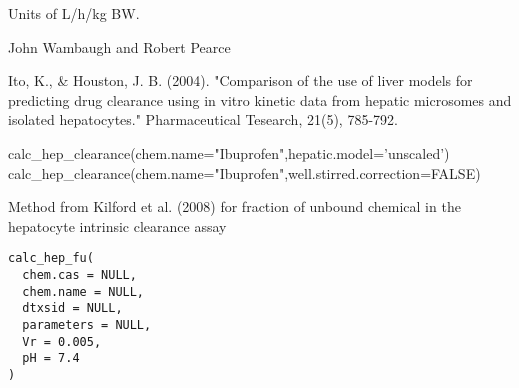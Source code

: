 \documentclass[a4paper]{book}
\begin{document}
%
\begin{Value}
\begin{ldescription}
\item[\code{Hepatic Clearance}] Units of L/h/kg BW.
\end{ldescription}
\end{Value}
%
\begin{Author}\relax
John Wambaugh and Robert Pearce
\end{Author}
%
\begin{References}\relax
Ito, K., \& Houston, J. B. (2004). "Comparison of the use of liver models for 
predicting drug clearance using in vitro kinetic data from hepatic microsomes 
and isolated hepatocytes." Pharmaceutical Tesearch, 21(5), 785-792.
\end{References}
%
\begin{Examples}
\begin{ExampleCode}

calc_hep_clearance(chem.name="Ibuprofen",hepatic.model='unscaled')
calc_hep_clearance(chem.name="Ibuprofen",well.stirred.correction=FALSE)


\end{ExampleCode}
\end{Examples}
%
\begin{Description}\relax
Method from Kilford et al. (2008) for fraction of unbound chemical in the 
hepatocyte intrinsic clearance assay
\end{Description}
%
\begin{Usage}
\begin{verbatim}
calc_hep_fu(
  chem.cas = NULL,
  chem.name = NULL,
  dtxsid = NULL,
  parameters = NULL,
  Vr = 0.005,
  pH = 7.4
)
\end{verbatim}
\end{Usage}
%
\end{document}
